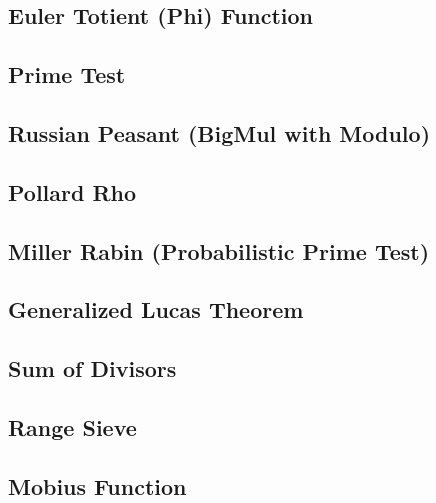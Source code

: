 \subsection{Euler Totient (Phi) Function}



\subsection{Prime Test}


\subsection{Russian Peasant (BigMul with Modulo)}


\subsection{Pollard Rho}


\subsection{Miller Rabin (Probabilistic Prime Test)}


\subsection{Generalized Lucas Theorem}


\subsection{Sum of Divisors}


\subsection{Range Sieve}


\subsection{Mobius Function}



